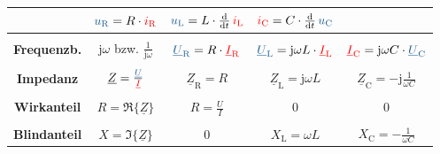\begin{frame}
\begin{table}[h]
{\begin{tabular}{ |c|c|c|c|c| }
                & $ \ecv{u_{\mathrm{R}}} = R \cdot \eci{i_{\mathrm R}} $     
                & $ \ecv{u_{\mathrm{L}}} = L \cdot \frac{\d}{\d t}\, \eci{i_{\mathrm{L}}} $ 
                & $ \eci{i_{\mathrm{C}}} = C \cdot \frac{\d}{\d t}\, \ecv{u_{\mathrm{C}}} $ \\[+4pt]
        \hline &&&&\\[-6pt]
        \textbf{Frequenzb.}
                & $ \mathrm{j}\omega $ bzw. $ \frac{1}{\mathrm{j}\omega} $
                & $ \ecv{\underline{U}_{\mathrm R}} = R                   \cdot \eci{\underline{I}_{\mathrm R}} $ 
                & $ \ecv{\underline{U}_{\mathrm L}} = \mathrm{j}\omega L  \cdot \eci{\underline{I}_{\mathrm L}} $
                & $ \eci{\underline{I}_{\mathrm C}} = \mathrm{j}\omega C  \cdot \ecv{\underline{U}_{\mathrm C}} $ \\[+4pt]
        \hline &&&&\\[-6pt]
        \textbf{Impedanz}
                & $ \underline{Z} = \frac{\ecv{\underline{U}}}{\eci{\underline{I}}} $
                & $ \underline{Z}_{\mathrm R} = R $ 
                & $ \underline{Z}_{\mathrm L} = \mathrm{j}\omega L $
                & $ \underline{Z}_{\mathrm C} = -\mathrm{j}\frac{1}{\omega C} $ \\[+4pt]
        \hline &&&&\\[-6pt]
        \textbf{Wirkanteil}
                & $ R = \Re\{\underline{Z}\} $
                & $ R = \frac{U}{I} $
                & $ 0 $
                & $ 0 $ \\[+4pt]
                \hline &&&&\\[-6pt]
        \textbf{Blindanteil}
                & $ X = \Im\{\underline{Z}\} $
                & $ 0 $
                & $ X_{\mathrm L} = \omega L $
                & $ X_{\mathrm C} = -\frac{1}{\omega C}$ \\[+4pt]
        \hline
    \end{tabular}
    } %
    \end{table}
    
\end{frame}



